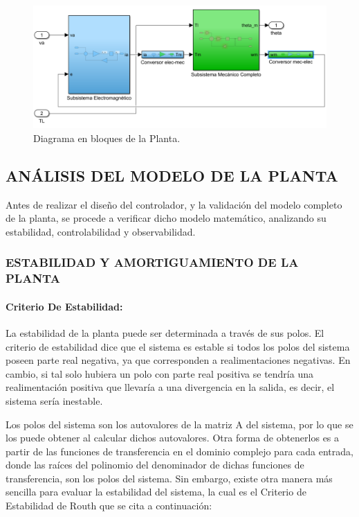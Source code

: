 \documentclass{article}
\begin{document}
\begin{sloppypar}
\begin{figure}[H]
    \centering
    \includegraphics[width=1\textwidth] {Diagrama en bloques de la Planta}
    \caption{Diagrama en bloques de la Planta.}
    \label{fig:Diagrama en bloques de la Planta}
\end{figure}


\subsection{ANÁLISIS DEL MODELO DE LA PLANTA}
\label{sec:ANÁLISIS DEL MODELO DE LA PLANTA}

Antes de realizar el diseño del controlador, y la validación del modelo completo de la planta, se procede a verificar dicho modelo matemático, analizando su estabilidad, controlabilidad y observabilidad.

\subsubsection{ESTABILIDAD Y AMORTIGUAMIENTO DE LA PLANTA}
\label{sec:ESTABILIDAD Y AMORTIGUAMIENTO DE LA PLANTA}

\paragraph{Criterio De Estabilidad:}
\label{sec:Criterio De Estabilidad:}
\hfill

\hfill

La estabilidad de la planta puede ser determinada a través de sus polos. El criterio de estabilidad dice que el sistema es estable si todos los polos del sistema poseen parte real negativa, ya que corresponden a realimentaciones negativas. En cambio, si tal solo hubiera un polo con parte real positiva se tendría una realimentación positiva que llevaría a una divergencia en la salida, es decir, el sistema sería inestable.

Los polos del sistema son los autovalores de la matriz A del sistema, por lo que se los puede obtener al calcular dichos autovalores.
Otra forma de obtenerlos es a partir de las funciones de transferencia en el dominio complejo para cada entrada, donde las raíces del polinomio del denominador de dichas funciones de transferencia, son los polos del sistema.
Sin embargo, existe otra manera más sencilla para evaluar la estabilidad del sistema, la cual es el Criterio de Estabilidad de Routh que se cita a continuación:


\end{sloppypar}
\end{document}
